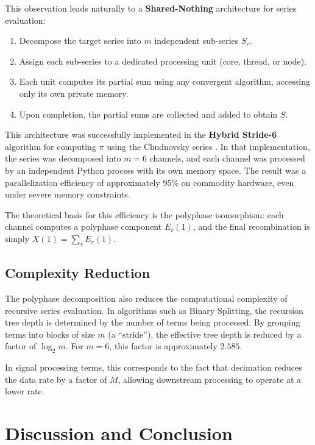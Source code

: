 \documentclass[12pt,a4paper]{article}
\theoremstyle{plain}
\theoremstyle{definition}
\theoremstyle{remark}
\begin{document}
This observation leads naturally to a \textbf{Shared-Nothing} architecture \cite{stonebraker1986case} for series evaluation:
\begin{enumerate}
    \item Decompose the target series into \(m\) independent sub-series \(S_r\).
    \item Assign each sub-series to a dedicated processing unit (core, thread, or node).
    \item Each unit computes its partial sum using any convergent algorithm, accessing only its own private memory.
    \item Upon completion, the partial sums are collected and added to obtain \(S\).
\end{enumerate}

This architecture was successfully implemented in the \textbf{Hybrid Stride-6} algorithm for computing \(\pi\) using the Chudnovsky series \cite{chudnovsky}. In that implementation, the series was decomposed into \(m=6\) channels, and each channel was processed by an independent Python process with its own memory space. The result was a parallelization efficiency of approximately 95\% on commodity hardware, even under severe memory constraints.

The theoretical basis for this efficiency is the polyphase isomorphism: each channel computes a polyphase component \(E_r(1)\), and the final recombination is simply \(X(1) = \sum_r E_r(1)\).

\subsection{Complexity Reduction}
The polyphase decomposition also reduces the computational complexity of recursive series evaluation. In algorithms such as Binary Splitting, the recursion tree depth is determined by the number of terms being processed. By grouping terms into blocks of size \(m\) (a ``stride''), the effective tree depth is reduced by a factor of \(\log_2 m\). For \(m=6\), this factor is approximately \(2.585\).

In signal processing terms, this corresponds to the fact that decimation reduces the data rate by a factor of \(M\), allowing downstream processing to operate at a lower rate.

\section{Discussion and Conclusion}
\label{sec:conclusion}
\end{document}

